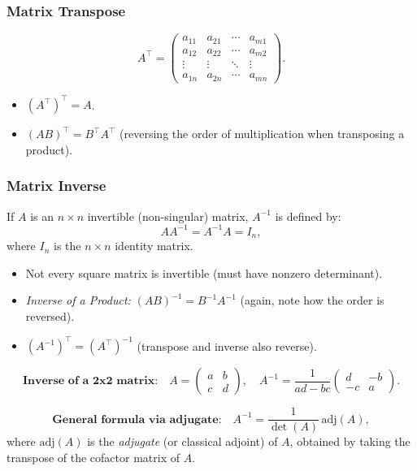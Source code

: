 \subsubsection{Matrix Transpose}
\[
A^\top =
\begin{pmatrix}
a_{11} & a_{21} & \cdots & a_{m1} \\
a_{12} & a_{22} & \cdots & a_{m2} \\
\vdots & \vdots & \ddots & \vdots \\
a_{1n} & a_{2n} & \cdots & a_{mn}
\end{pmatrix}.
\]
\begin{itemize}
\item $(A^\top)^\top = A$.
\item $(AB)^\top = B^\top A^\top$ (reversing the order of multiplication when transposing a product).
\end{itemize}

\subsubsection{Matrix Inverse}
If $A$ is an $n \times n$ invertible (non-singular) matrix, $A^{-1}$ is defined by:
\[
A A^{-1} = A^{-1} A = I_n,
\]
where $I_n$ is the $n \times n$ identity matrix.

\begin{itemize}
\item Not every square matrix is invertible (must have nonzero determinant).
\item \emph{Inverse of a Product:} $(AB)^{-1} = B^{-1} A^{-1}$ (again, note how the order is reversed).
\item $(A^{-1})^\top = (A^\top)^{-1}$ (transpose and inverse also reverse).
\end{itemize}

\[
\textbf{Inverse of a 2x2 matrix:}
\quad
A = \begin{pmatrix}
a & b \\
c & d
\end{pmatrix},
\quad
A^{-1} = \frac{1}{ad - bc}
\begin{pmatrix}
d & -b \\
-c & a
\end{pmatrix}.
\]

\[
\textbf{General formula via adjugate:}
\quad
A^{-1} = \frac{1}{\det(A)} \,\text{adj}(A),
\]
where \(\text{adj}(A)\) is the \emph{adjugate} (or classical adjoint) of \(A\), 
obtained by taking the transpose of the cofactor matrix of \(A\).

